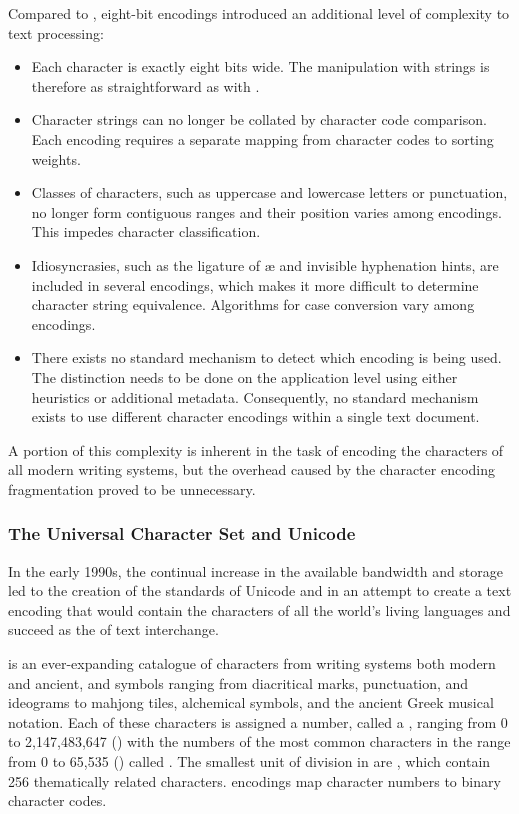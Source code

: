 Compared to , eight-bit encodings introduced an additional level
of complexity to text processing:
\begin{itemize}
  \item Each character is exactly eight bits wide. The manipulation with strings
    is therefore as straightforward as with .
  \item Character strings can no longer be collated by character code
    comparison. Each encoding requires a separate mapping from character codes
    to sorting weights.
  \item Classes of characters, such as uppercase and lowercase letters or
    punctuation, no longer form contiguous ranges and their position varies
    among encodings. This impedes character classification.
  \item Idiosyncrasies, such as the ligature of æ and invisible hyphenation
    hints, are included in several encodings, which makes it more difficult to
    determine character string equivalence. Algorithms for case conversion vary
    among encodings.
  \item There exists no standard mechanism to detect which encoding is being
    used. The distinction needs to be done on the application level using either
    heuristics or additional metadata. Consequently, no standard mechanism
    exists to use different character encodings within a single text document.
\end{itemize}
A portion of this complexity is inherent in the task of encoding the characters
of all modern writing systems, but the overhead caused by the character encoding
fragmentation proved to be unnecessary.

\subsubsection{The Universal Character Set and Unicode}
In the early 1990s, the continual increase in the available bandwidth and
storage led to the creation of the standards of Unicode
\cite{unicode91,unicode92} and  in an attempt to create a text
encoding that would contain the characters of all the world's living languages
and succeed  as the  of text
interchange.

 is an ever-expanding catalogue of characters from writing systems
both modern and ancient, and symbols ranging from diacritical marks,
punctuation, and ideograms to mahjong tiles, alchemical symbols, and the ancient
Greek musical notation. Each of these characters is assigned a number, called
a , ranging from 0 to 2,147,483,647 () with the
numbers of the most common characters in the range from 0 to 65,535
() called . The smallest unit of division in
 are , which contain 256
thematically related characters.  encodings map character numbers
to binary character codes.

